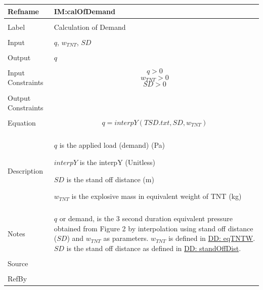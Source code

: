 \documentclass[12pt]{article}
\begin{document}
\noindent \begin{minipage}{\textwidth}
\begin{tabular}{p{} p{}}
\toprule \textbf{Refname} & \textbf{IM:calOfDemand}
\label{IM:calOfDemand}
\\ \midrule \\
Label & Calculation of Demand
\\ \midrule \\
Input & $q$, ${w_{TNT}}$, $SD$
\\ \midrule \\
Output & $q$
\\ \midrule \\
Input Constraints & \begin{displaymath}
                    q>0
                    \end{displaymath}
                    \begin{displaymath}
                    {w_{TNT}}>0
                    \end{displaymath}
                    \begin{displaymath}
                    SD>0
                    \end{displaymath}
\\ \midrule \\
Output Constraints & 
\\ \midrule \\
Equation & \begin{displaymath}
           q=interpY\left(TSD.txt,SD,{w_{TNT}}\right)
           \end{displaymath}
\\ \midrule \\
Description & \begin{symbDescription}
              \item{$q$ is the applied load (demand) (Pa)}
              \item{$interpY$ is the interpY (Unitless)}
              \item{$SD$ is the stand off distance (m)}
              \item{${w_{TNT}}$ is the explosive mass in equivalent weight of TNT (kg)}
              \end{symbDescription}
\\ \midrule \\
Notes & $q$ or demand, is the 3 second duration equivalent pressure obtained from Figure 2 by interpolation using stand off distance ($SD$) and ${w_{TNT}}$ as parameters. ${w_{TNT}}$ is defined in \hyperref[DD:eqTNTW]{DD: eqTNTW}. $SD$ is the stand off distance as defined in \hyperref[DD:standOffDist]{DD: standOffDist}.
\\ \midrule \\
Source & \cite{astm2009}
\\ \midrule \\
RefBy & 
\\ \bottomrule \end{tabular}
\end{minipage}
\end{document}
